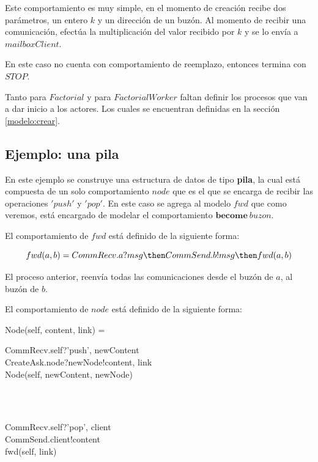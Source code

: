 Este comportamiento es muy simple, en el momento de creación recibe dos parámetros, un entero $k$ y un dirección de un buzón. Al momento de recibir una comunicación, efectúa la multiplicación del valor recibido por $k$ y se lo envía a $mailboxClient$.

En este caso no cuenta con comportamiento de reemplazo, entonces termina con $STOP$.

Tanto para $Factorial$ y para $FactorialWorker$ faltan definir los procesos que van a dar inicio a los actores. Los cuales se encuentran definidas en la sección \ref{modelo:crear}. 

\subsection{Ejemplo: una pila}
En este ejemplo se construye una estructura de datos de tipo \textbf{pila}, la cual está compuesta de un solo comportamiento $node$ que es el que se encarga de recibir las operaciones $'push'$ y $'pop'$. En este caso se agrega al modelo $fwd$ que como veremos, está encargado de modelar el comportamiento $\textbf{become}\ buzon$.

El comportamiento de $fwd$ está definido de la siguiente forma:

\[
  fwd(a, b) = CommRecv.a?msg \then CommSend.b!msg \then fwd(a, b)
\]

El proceso anterior, reenvía todas las comunicaciones desde el buzón de $a$, al buzón de $b$.

El comportamiento de $node$ está definido de la siguiente forma:

\begin{process}
Node(self, content, link) = {} \\ \quad
\begin{block}
CommRecv.self?\langle 'push', newContent \rangle \then \\
CreateAsk.node?newNode!\langle content, link \rangle \then \\
Node(self, newContent, newNode)
\end{block} \\
\Extchoice \\ \quad
\begin{block}
CommRecv.self?\langle 'pop', client \rangle \then  \\
CommSend.client!\langle content \rangle \then  \\
fwd(self, link)
\end{block}

\end{process}

